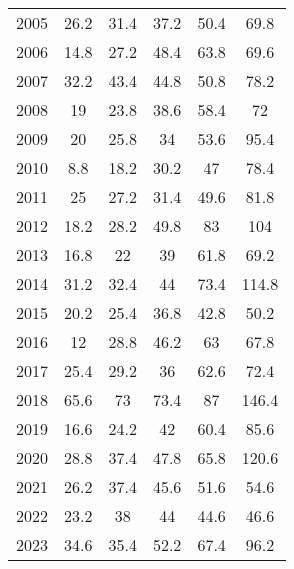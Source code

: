 \begin{table}[H]
\begin{tabular}{cccccc}
2005                           & 26.2           & 31.4           & 37.2           & 50.4            & 69.8            \\
2006                           & 14.8           & 27.2           & 48.4           & 63.8            & 69.6            \\
2007                           & 32.2           & 43.4           & 44.8           & 50.8            & 78.2            \\
2008                           & 19             & 23.8           & 38.6           & 58.4            & 72              \\
2009                           & 20             & 25.8           & 34             & 53.6            & 95.4            \\
2010                           & 8.8            & 18.2           & 30.2           & 47              & 78.4            \\
2011                           & 25             & 27.2           & 31.4           & 49.6            & 81.8            \\
2012                           & 18.2           & 28.2           & 49.8           & 83              & 104             \\
2013                           & 16.8           & 22             & 39             & 61.8            & 69.2            \\
2014                           & 31.2           & 32.4           & 44             & 73.4            & 114.8           \\
2015                           & 20.2           & 25.4           & 36.8           & 42.8            & 50.2            \\
2016                           & 12             & 28.8           & 46.2           & 63              & 67.8            \\
2017                           & 25.4           & 29.2           & 36             & 62.6            & 72.4            \\
2018                           & 65.6           & 73             & 73.4           & 87              & 146.4           \\
2019                           & 16.6           & 24.2           & 42             & 60.4            & 85.6            \\
2020                           & 28.8           & 37.4           & 47.8           & 65.8            & 120.6           \\
2021                           & 26.2           & 37.4           & 45.6           & 51.6            & 54.6            \\
2022                           & 23.2           & 38             & 44             & 44.6            & 46.6            \\
2023                           & 34.6           & 35.4           & 52.2           & 67.4            & 96.2       \\
\bottomrule
\end{tabular}
\end{table}
